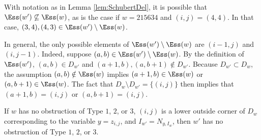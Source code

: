 \begin{remark}\label{rem:newEss}
With notation as in Lemma \ref{lem:SchubertDel}, it is possible that $\Ess(w') \not\subseteq \Ess(w)$, as is the case if $w = 215634$ and $(i,j) = (4,4)$.  In that case, $(3,4), (4,3) \in \Ess(w') \setminus \Ess(w)$.  

In general, the only possible elements of $\Ess(w') \setminus \Ess(w)$ are $(i-1,j)$ and $(i,j-1)$.  Indeed, suppose $(a,b) \in \Ess(w') \setminus \Ess(w)$. By the definition of $\Ess(w')$, $(a,b) \in D_{w'}$ and $(a+1,b), (a,b+1) \notin D_{w'}$.  Because $D_{w'} \subset D_w$, the assumption $(a,b) \notin \Ess(w)$ implies $(a+1,b) \in \Ess(w)$ or $(a,b+1) \in \Ess(w)$.  The fact that $D_w \setminus D_{w'} = \{(i,j)\}$ then implies that $(a+1,b) = (i,j)$ or $(a,b+1) = (i,j)$.
\end{remark}

\begin{corollary}\label{cor:GrobnerDel}
If $w$ has no obstruction of Type $1$, $2$, or $3$, $(i,j)$ is a lower outside corner of $D_w$ corresponding to the variable $y = z_{i,j}$, and $I_{w'} =N_{y,I_w}$, then $w'$ has no obstruction of Type $1$, $2$, or $3$.  
\end{corollary}

